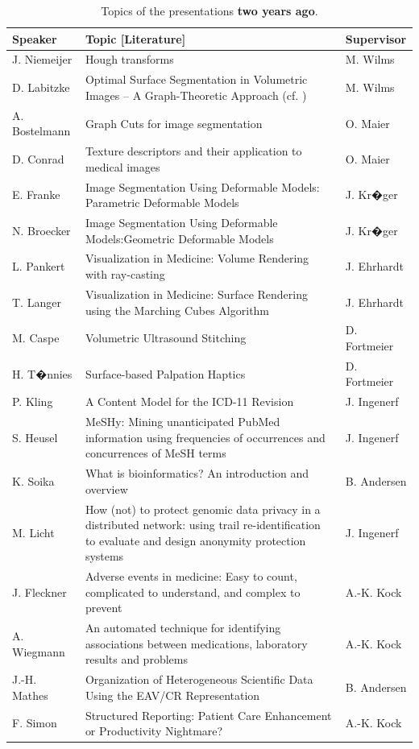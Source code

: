 \documentclass[
12pt,
headsepline,
bibliography=totoc,
twoside=semi,
fleqn
]{scrartcl}
\begin{document}
\begin{table}[t]
 \footnotesize
 \caption{\label{tab:table1} Topics of the presentations \textbf{two years ago}.}
 \vspace{1ex}
 \centering 
 \begin{tabular}{p{2.5cm}p{8.7cm}p{2.8cm}}
 \toprule
 \textbf{Speaker} & \textbf{Topic [Literature]} & \textbf{Supervisor} \\
 \midrule
 J. Niemeijer & Hough transforms & M. Wilms \\
 D. Labitzke & Optimal Surface Segmentation in Volumetric Images -- A Graph-Theoretic Approach (cf. \citep{Li_TPAMI_2006}) & M. Wilms \\
 A. Bostelmann & Graph Cuts for image segmentation
 & O. Maier \\
 D. Conrad & Texture descriptors and their application to medical images & O. Maier
 \\
 E. Franke & Image Segmentation Using Deformable Models: Parametric Deformable
 Models & J. Kr�ger \\
 N. Broecker & Image Segmentation Using Deformable Models:Geometric Deformable
 Models & J. Kr�ger \\
 L. Pankert & Visualization in Medicine: Volume Rendering with ray-casting
 & J. Ehrhardt \\
 T. Langer & Visualization in Medicine: Surface Rendering using the Marching Cubes
 Algorithm & J. Ehrhardt \\
 M. Caspe & Volumetric Ultrasound Stitching & D. Fortmeier \\
 H. T�nnies & Surface-based Palpation Haptics & D. Fortmeier \\
 \midrule
 P. Kling & A Content Model for the ICD-11 Revision & J. Ingenerf \\
 S. Heusel & MeSHy: Mining unanticipated PubMed information using frequencies of
 occurrences and concurrences of MeSH terms & J. Ingenerf \\
 K. Soika & What is bioinformatics? An introduction and overview & B. Andersen \\
 M. Licht & How (not) to protect genomic data privacy in a distributed network: using trail
 re-identification to evaluate and design anonymity protection systems & J. Ingenerf \\
 J. Fleckner & Adverse events in medicine: Easy to count, complicated to understand, and
 complex to prevent & A.-K. Kock \\
 A. Wiegmann & An automated technique for identifying associations between medications,
 laboratory results and problems & A.-K. Kock \\
 J.-H. Mathes & Organization of Heterogeneous Scientific Data Using the EAV/CR
 Representation & B. Andersen\\
 F. Simon & Structured Reporting: Patient Care Enhancement or Productivity Nightmare? & A.-K. Kock\\
 \bottomrule
 \end{tabular}
 \vspace{2ex}
\end{table}


\newpage
%

\footnotesize
\end{document}
